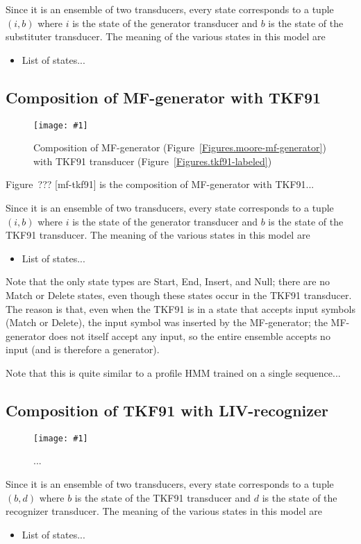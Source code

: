 \documentclass{article}
\newcommand{\figref}[1]{Figure~\ref{Figures.#1}}
\newcommand{\figlabel}[1]{\label{Figures.#1}}
\newcommand{\needfigref}[1]{Figure~??? [#1] }
\newcommand{\easyfig}[4]{
\begin{figure}
\texttt{[image: \#1]}
\caption{ \figlabel{#3} #4}
\end{figure}}
\newcommand{\tallpdffig}[2]{\easyfig{#1-fig.pdf}{height=\textheight}{#1}{#2}}
\begin{document}
Since it is an ensemble of two transducers, every state corresponds to a tuple $(i,b)$
where
$i$ is the state of the generator transducer and
$b$ is the state of the substituter transducer.
The meaning of the various states in this model are
\begin{itemize}
\item List of states...
\end{itemize}

\subsection{Composition of MF-generator with TKF91}
\tallpdffig{mf-tkf91}{Composition of MF-generator (\figref{moore-mf-generator}) with TKF91 transducer (\figref{tkf91-labeled})}

\needfigref{mf-tkf91} is the composition of MF-generator with TKF91...

Since it is an ensemble of two transducers, every state corresponds to a tuple $(i,b)$
where
$i$ is the state of the generator transducer and
$b$ is the state of the TKF91 transducer.
The meaning of the various states in this model are
\begin{itemize}
\item List of states...
\end{itemize}

Note that the only state types are Start, End, Insert, and Null;
there are no Match or Delete states, even though these states occur in the TKF91 transducer.
The reason is that, even when the TKF91 is in a state that accepts input symbols (Match or Delete),
the input symbol was inserted by the MF-generator;
the MF-generator does not itself accept any input,
so the entire ensemble accepts no input
(and is therefore a generator).

Note that this is quite similar to a profile HMM trained on a single sequence...

\subsection{Composition of TKF91 with LIV-recognizer}

\tallpdffig{tkf91-liv}{...}

Since it is an ensemble of two transducers, every state corresponds to a tuple $(b,d)$
where
$b$ is the state of the TKF91 transducer and
$d$ is the state of the recognizer transducer.
The meaning of the various states in this model are
\begin{itemize}
\item List of states...
\end{itemize}
\end{document}
